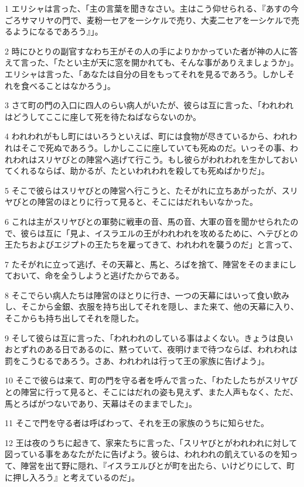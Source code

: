 \par 1 エリシャは言った、「主の言葉を聞きなさい。主はこう仰せられる、『あすの今ごろサマリヤの門で、麦粉一セアを一シケルで売り、大麦二セアを一シケルで売るようになるであろう』」。
\par 2 時にひとりの副官すなわち王がその人の手によりかかっていた者が神の人に答えて言った、「たとい主が天に窓を開かれても、そんな事がありえましょうか」。エリシャは言った、「あなたは自分の目をもってそれを見るであろう。しかしそれを食べることはなかろう」。
\par 3 さて町の門の入口に四人のらい病人がいたが、彼らは互に言った、「われわれはどうしてここに座して死を待たねばならないのか。
\par 4 われわれがもし町にはいろうといえば、町には食物が尽きているから、われわれはそこで死ぬであろう。しかしここに座していても死ぬのだ。いっその事、われわれはスリヤびとの陣営へ逃げて行こう。もし彼らがわれわれを生かしておいてくれるならば、助かるが、たといわれわれを殺しても死ぬばかりだ」。
\par 5 そこで彼らはスリヤびとの陣営へ行こうと、たそがれに立ちあがったが、スリヤびとの陣営のほとりに行って見ると、そこにはだれもいなかった。
\par 6 これは主がスリヤびとの軍勢に戦車の音、馬の音、大軍の音を聞かせられたので、彼らは互に「見よ、イスラエルの王がわれわれを攻めるために、ヘテびとの王たちおよびエジプトの王たちを雇ってきて、われわれを襲うのだ」と言って、
\par 7 たそがれに立って逃げ、その天幕と、馬と、ろばを捨て、陣営をそのままにしておいて、命を全うしようと逃げたからである。
\par 8 そこでらい病人たちは陣営のほとりに行き、一つの天幕にはいって食い飲みし、そこから金銀、衣服を持ち出してそれを隠し、また来て、他の天幕に入り、そこからも持ち出してそれを隠した。
\par 9 そして彼らは互に言った、「われわれのしている事はよくない。きょうは良いおとずれのある日であるのに、黙っていて、夜明けまで待つならば、われわれは罰をこうむるであろう。さあ、われわれは行って王の家族に告げよう」。
\par 10 そこで彼らは来て、町の門を守る者を呼んで言った、「わたしたちがスリヤびとの陣営に行って見ると、そこにはだれの姿も見えず、また人声もなく、ただ、馬とろばがつないであり、天幕はそのままでした」。
\par 11 そこで門を守る者は呼ばわって、それを王の家族のうちに知らせた。
\par 12 王は夜のうちに起きて、家来たちに言った、「スリヤびとがわれわれに対して図っている事をあなたがたに告げよう。彼らは、われわれの飢えているのを知って、陣営を出て野に隠れ、『イスラエルびとが町を出たら、いけどりにして、町に押し入ろう』と考えているのだ」。
